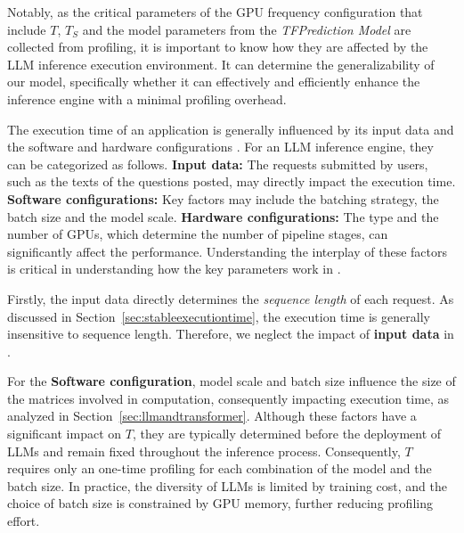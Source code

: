 Notably, as the critical parameters of the GPU frequency configuration that include $T$, $T_S$ and the model parameters from the \textit{TFPrediction Model} are collected from profiling, it is important to know how they are affected by the LLM inference execution environment.
It can determine the generalizability of our model, specifically whether it can effectively and efficiently enhance the inference engine with a minimal profiling overhead.

The execution time of an application is generally influenced by its input data and the software and hardware configurations \cite{fu2024serverlessllm,moon2024lpu}. 
For an LLM inference engine, they can be categorized as follows.
\textbf{Input data:} The requests submitted by users, such as the texts of the questions posted, may directly impact the execution time.
\textbf{Software configurations:} Key factors may include the batching strategy, the batch size and the model scale.
\textbf{Hardware configurations:} The type and the number of GPUs, which determine the number of pipeline stages, can significantly affect the performance.
Understanding the interplay of these factors is critical in understanding how the key parameters work in \thisproj{}.


Firstly, the input data directly determines the \textit{sequence length} of each request.
As discussed in Section~\ref{sec:stableexecutiontime}, the execution time is generally insensitive to sequence length.
Therefore, we neglect the impact of \textbf{input data} in \thisproj{}.


For the \textbf{Software configuration}, model scale and batch size influence the size of the matrices involved in computation, consequently impacting execution time, as analyzed in Section~\ref{sec:llmandtransformer}.
Although these factors have a significant impact on $T$, they are typically determined before the deployment of LLMs and remain fixed throughout the inference process.
Consequently, $T$ requires only an one-time profiling for each combination of the model and the batch size.
In practice, the diversity of LLMs is limited by training cost, and the choice of batch size is constrained by GPU memory, further reducing profiling effort. 



